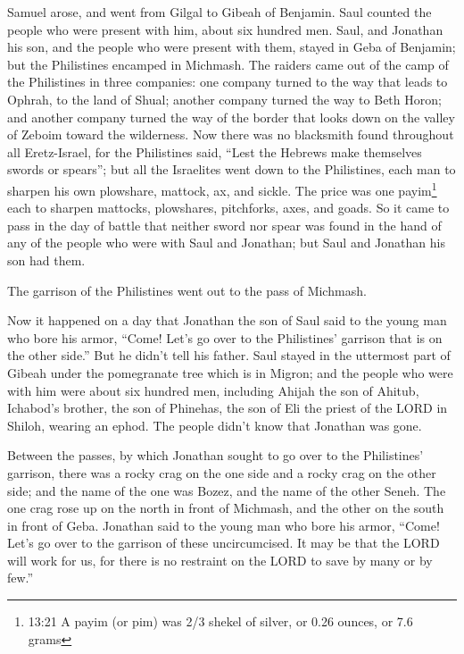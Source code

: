 \myverse{}Samuel arose, and went from Gilgal to Gibeah of Benjamin. Saul
counted the people who were present with him, about six hundred men.
\myverse{}Saul, and Jonathan his son, and the people who were present with them, stayed
in Geba of Benjamin; but the Philistines encamped in Michmash.
\myverse{}The raiders came out of the camp of the Philistines in three companies: one
company turned to the way that leads to Ophrah, to the land of Shual;
\myverse{}another company turned the way to Beth Horon; and another company turned
the way of the border that looks down on the valley of Zeboim toward the wilderness.
\myverse{}Now there was no blacksmith found throughout all Eretz-Israel, for the Philistines
said, “Lest the Hebrews make themselves swords or spears”;
\myverse{}but all the Israelites went down to the Philistines, each man to sharpen
his own plowshare, mattock, ax, and sickle.
\myverse{}The price was one payim\footnote{13:21 A payim (or pim) was 2/3 shekel of silver, or 0.26 ounces, or 7.6 grams} each to sharpen
mattocks, plowshares, pitchforks, axes, and goads.
\myverse{}So it came to pass in the day of battle that neither sword nor spear was
found in the hand of any of the people who were with Saul and Jonathan; but Saul and Jonathan his son
had them.

\myverse{}The garrison of the Philistines went out to the pass of Michmash.


\mychapter{} \myverse*{}Now it happened on a day that Jonathan the son of Saul said to
the young man who bore his armor, “Come! Let’s go over to the Philistines’ garrison that is on the other
side.” But he didn’t tell his father.
\myverse{}Saul stayed in the uttermost part of Gibeah under the pomegranate tree which
is in Migron; and the people who were with him were about six hundred men,
\myverse{}including Ahijah the son of Ahitub, Ichabod’s brother, the son of Phinehas,
the son of Eli the priest of the LORD in Shiloh, wearing an ephod. The people didn’t know that Jonathan
was gone.

\myverse{}Between the passes, by which Jonathan sought to go over to the
Philistines’ garrison, there was a rocky crag on the one side and a rocky crag on the other side; and
the name of the one was Bozez, and the name of the other Seneh.
\myverse{}The one crag rose up on the north in front of Michmash, and the other on the
south in front of Geba.
\myverse{}Jonathan said to the young man who bore his armor, “Come! Let’s go over to
the garrison of these uncircumcised. It may be that the LORD will work for us, for there is no restraint
on the LORD to save by many or by few.”

